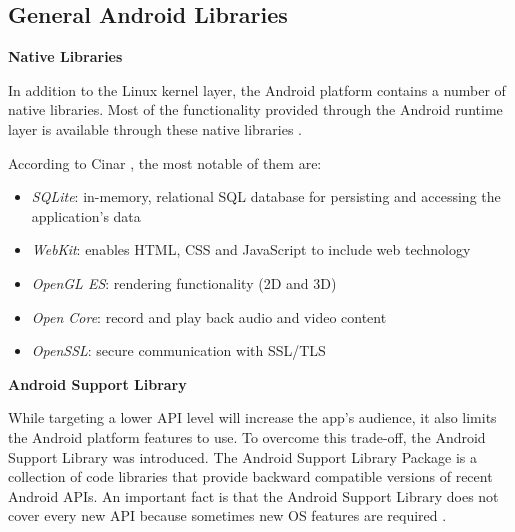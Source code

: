 \subsection{General Android Libraries}
\label{cha:general_android_libs}

\noindent
\textbf{Native Libraries}

In addition to the Linux kernel layer, the Android platform contains a number of native libraries. Most of the functionality provided through the Android runtime layer is available through these native libraries \cite{cinar_2015_android_quick_apis_reference}.

According to Cinar \cite{cinar_2015_android_quick_apis_reference}, the most notable of them are:

\begin{itemize}
    \item \textit{SQLite}: in-memory, relational SQL database for persisting and accessing the application's data
    \item \textit{WebKit}: enables HTML, CSS and JavaScript to include web technology
    \item \textit{OpenGL ES}: rendering functionality (2D and 3D)
    \item \textit{Open Core}: record and play back audio and video content
    \item \textit{OpenSSL}: secure communication with SSL/TLS
\end{itemize}

\noindent
\textbf{Android Support Library}

While targeting a lower API level will increase the app's audience, it also limits the Android platform features to use. To overcome this trade-off, the Android Support Library was introduced. The Android Support Library Package is a collection of code libraries that provide backward compatible versions of recent Android APIs.
An important fact is that the Android Support Library does not cover every new API because sometimes new OS features are required \cite{cinar_2015_android_quick_apis_reference}.